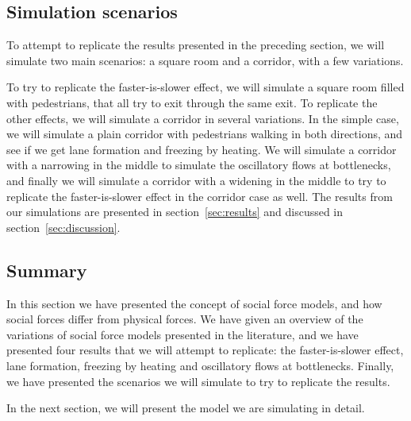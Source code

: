 \subsection{Simulation scenarios}
To attempt to replicate the results presented in the preceding section, we 
will simulate two main scenarios: a square room and a corridor, with a few 
variations.

To try to replicate the faster-is-slower effect, we will simulate 
a square room filled with pedestrians, that all try to exit through the same 
exit. To replicate the other effects, we will simulate a corridor in several 
variations. In the simple case, we will simulate a plain corridor with 
pedestrians walking in both directions, and see if we get lane formation and 
freezing by heating. We will simulate a corridor with a narrowing in the 
middle to simulate the oscillatory flows at bottlenecks, and finally we will 
simulate a corridor with a widening in the middle to try to replicate the 
faster-is-slower effect in the corridor case as well. The results from our 
simulations are presented in section~\ref{sec:results} and discussed in 
section~\ref{sec:discussion}.

\subsection{Summary}
In this section we have presented the concept of social force models, and how 
social forces differ from physical forces. We have given an overview of the 
variations of social force models presented in the literature, and we have 
presented four results that we will attempt to replicate: the faster-is-slower 
effect, lane formation, freezing by heating and oscillatory flows at 
bottlenecks. Finally, we have presented the scenarios we will simulate to try 
to replicate the results.

In the next section, we will present the model we are simulating in detail.
